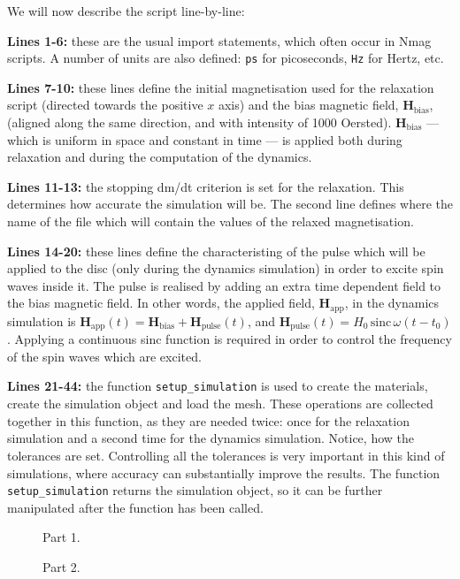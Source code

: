 \documentclass[11pt,oneside,openany]{article}
\newcommand{\vecs}[2]{\mathbf{#1_{\mathrm{#2}}}}
\begin{document}
We will now describe the script line-by-line:

\textbf{Lines 1-6:} these are the usual import statements, which often occur
in Nmag scripts. A number of units are also defined: \verb|ps|
for picoseconds, \verb|Hz| for Hertz, etc.

\textbf{Lines 7-10:} these lines define the initial magnetisation used for the
relaxation script (directed towards the positive $x$ axis) and the bias
magnetic field, $\vecs{H}{bias}$, (aligned along the same direction, and with
intensity of 1000 Oersted). $\vecs{H}{bias}$ --- which is uniform in space and
constant in time --- is applied both during relaxation and during the
computation of the dynamics.

\textbf{Lines 11-13:} the stopping dm/dt criterion is set for the relaxation.
This determines how accurate the simulation will be.
The second line defines where the name of the file which will contain the
values of the relaxed magnetisation.

\textbf{Lines 14-20:} these lines define the characteristing of the pulse which
will be applied to the disc (only during the dynamics simulation) in order to
excite spin waves inside it.  The pulse is realised by adding an extra time
dependent field to the bias magnetic field. In other words, the applied field,
$\vecs{H}{app}$, in the dynamics simulation is
$\vecs{H}{app}(t) = \vecs{H}{bias} + \vecs{H}{pulse}(t)$,
and $\vecs{H}{pulse}(t) = H_0 \, \mathrm{sinc}\,\omega (t - t_0)$.
Applying a continuous sinc function is required in order to control the
frequency of the spin waves which are excited.

\textbf{Lines 21-44:} the function \verb|setup_simulation| is used to create
the materials, create the simulation object and load the mesh. These operations
are collected together in this function, as they are needed twice: once for the
relaxation simulation and a second time for the dynamics simulation.  Notice,
how the tolerances are set. Controlling all the tolerances is very important in
this kind of simulations, where accuracy can substantially improve the
results. The function \verb|setup_simulation| returns the simulation object, so
it can be further manipulated after the function has been called.

\begin{figure}[!p]

\caption{Part 1.}
\label{fig:script1of2}
\end{figure}

\begin{figure}[!p]

\caption{Part 2.}
\label{fig:script2of2}
\end{figure}
\end{document}
